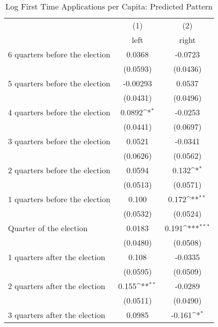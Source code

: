 \begin{table}[htbp]\centering
\def\sym#1{\ifmmode^{#1}\else\(^{#1}\)\fi}
\caption{Log First Time Applications per Capita: Predicted Pattern}
\begin{tabular}{l*{2}{c}}
\hline\hline
                    &\multicolumn{1}{c}{(1)}&\multicolumn{1}{c}{(2)}\\
                    &\multicolumn{1}{c}{left}&\multicolumn{1}{c}{right}\\
\hline
 6 quarters before the election&      0.0368         &     -0.0723         \\
                    &    (0.0593)         &    (0.0436)         \\
[1em]
 5 quarters before the election&    -0.00293         &      0.0537         \\
                    &    (0.0431)         &    (0.0496)         \\
[1em]
 4 quarters before the election&      0.0892\sym{*}  &     -0.0253         \\
                    &    (0.0441)         &    (0.0697)         \\
[1em]
 3 quarters before the election&      0.0521         &     -0.0341         \\
                    &    (0.0626)         &    (0.0562)         \\
[1em]
 2 quarters before the election&      0.0594         &       0.132\sym{*}  \\
                    &    (0.0513)         &    (0.0571)         \\
[1em]
 1 quarters before the election&       0.100         &       0.172\sym{**} \\
                    &    (0.0532)         &    (0.0524)         \\
[1em]
Quarter of the election&      0.0183         &       0.191\sym{***}\\
                    &    (0.0480)         &    (0.0508)         \\
[1em]
 1 quarters after the election&       0.108         &     -0.0335         \\
                    &    (0.0595)         &    (0.0509)         \\
[1em]
 2 quarters after the election&       0.155\sym{**} &     -0.0289         \\
                    &    (0.0511)         &    (0.0490)         \\
[1em]
 3 quarters after the election&      0.0985         &      -0.161\sym{*}  \\

\end{tabular}
\end{table}
